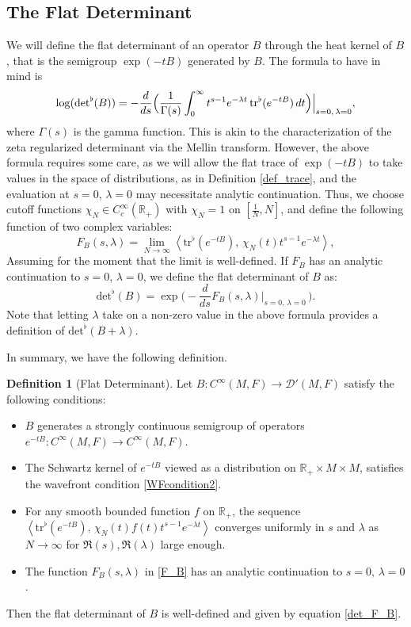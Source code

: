 \documentclass[reqno]{amsart}
\theoremstyle{definition}
\newtheorem{defn}[thm]{Definition}
\theoremstyle{remark}
\newcommand{\R}{\mathbb{R}}
\newcommand{\D}{\mathcal{D}'}
\newcommand{\C}{C^\infty}
\newcommand{\tr}{\mathrm{tr}^\flat}
\renewcommand{\det}{\mathrm{det}^\flat}
\newcommand{\pair}[2]{\left\langle #1,\, #2 \right\rangle}
\begin{document}
\subsection{The Flat Determinant}
\label{subsection_det}

We will define the flat determinant of an operator $B$ through the heat kernel of $B$, that is the semigroup $\exp(-tB)$ generated by $B$. The formula to have in mind is
\begin{equation}
\log(\det(B)) = -\frac{d}{ds}\Bigl(\frac{1}{\Gamma(s)}\int_0^\infty t^{s-1}e^{-\lambda t}\,\tr(e^{-tB}) \, dt\Bigr)\Bigr|_{s=0,\,\lambda=0},
\end{equation}
where $\Gamma(s)$ is the gamma function. This is akin to the characterization of the zeta regularized determinant via the Mellin transform. However, the above formula requires some care, as we will allow the flat trace of $\exp(-tB)$ to take values in the space of distributions, as in Definition \ref{def_trace}, and the evaluation at $s=0$, $\lambda=0$ may necessitate analytic continuation. Thus, we choose cutoff functions $\chi_N\in\C_c(\R_+)$ with $\chi_N=1$ on $[\frac{1}{N},N]$, and define the following function of two complex variables:
\begin{equation}
\label{F_B}
F_B(s,\lambda) = \lim_{N\to\infty}\pair{\tr(e^{-tB})}{\chi_N(t) t^{s-1} e^{-\lambda t}},
\end{equation}
Assuming for the moment that the limit is well-defined. If $F_B$ has an analytic continuation to $s=0$, $\lambda=0$, we define the flat determinant of $B$ as:
\begin{equation}
\label{det_F_B}
\det(B) = \exp\Bigr(-\frac{d}{ds} F_B(s,\lambda)\Big|_{s=0,\,\lambda=0}\,\Bigr).
\end{equation}
Note that letting $\lambda$ take on a non-zero value in the above formula provides a definition of $\det(B+\lambda)$.

In summary, we have the following definition.
\begin{defn}[Flat Determinant]
\label{def_det}
Let $B \colon \C(M,F) \to \D(M,F)$ satisfy the following conditions:
\begin{itemize}
    \item $B$ generates a strongly continuous semigroup of operators $e^{-tB} \colon \C(M,F) \to \C(M,F)$.
    \item The Schwartz kernel of $e^{-tB}$ viewed as a distribution on $\R_+\times M\times M$, satisfies the wavefront condition \eqref{WFcondition2}.
    \item For any smooth bounded function $f$ on $\R_+$, the sequence $\pair{\tr(e^{-tB})}{\chi_N(t)f(t) t^{s-1} e^{-\lambda t}}$ converges uniformly in $s$ and $\lambda$ as $N\to\infty$ for $\Re(s), \Re(\lambda)$ large enough.
    \item The function $F_B(s,\lambda)$ in \eqref{F_B} has an analytic continuation to $s=0,\,\lambda=0$.
\end{itemize}
Then the flat determinant of $B$ is well-defined and given by equation \eqref{det_F_B}.
\end{defn}
\end{document}
